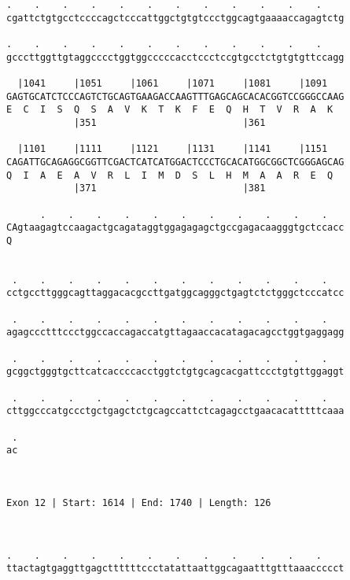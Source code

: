 \documentclass{article}
\begin{document}
\begin{Verbatim}
.    .    .    .    .    .    .    .    .    .    .    .    
cgattctgtgcctccccagctcccattggctgtgtccctggcagtgaaaaccagagtctg
                                                            
.    .    .    .    .    .    .    .    .    .    .    .    
gcccttggttgtaggcccctggtggcccccacctccctccgtgcctctgtgtgttccagg
                                                            
  |1041     |1051     |1061     |1071     |1081     |1091   
GAGTGCATCTCCCAGTCTGCAGTGAAGACCAAGTTTGAGCAGCACACGGTCCGGGCCAAG
E  C  I  S  Q  S  A  V  K  T  K  F  E  Q  H  T  V  R  A  K  
            |351                          |361              
  
  |1101     |1111     |1121     |1131     |1141     |1151   
CAGATTGCAGAGGCGGTTCGACTCATCATGGACTCCCTGCACATGGCGGCTCGGGAGCAG
Q  I  A  E  A  V  R  L  I  M  D  S  L  H  M  A  A  R  E  Q  
            |371                          |381              
  
      .    .    .    .    .    .    .    .    .    .    .   
CAgtaagagtccaagactgcagataggtggagagagctgccgagacaagggtgctccacc
Q                                                           
                                                            
  
 .    .    .    .    .    .    .    .    .    .    .    .   
cctgccttgggcagttaggacacgccttgatggcagggctgagtctctgggctcccatcc
                                                            
 .    .    .    .    .    .    .    .    .    .    .    .   
agagccctttccctggccaccagaccatgttagaaccacatagacagcctggtgaggagg
                                                            
 .    .    .    .    .    .    .    .    .    .    .    .   
gcggctgggtgcttcatcaccccacctggtctgtgcagcacgattccctgtgttggaggt
                                                            
 .    .    .    .    .    .    .    .    .    .    .    .   
cttggcccatgccctgctgagctctgcagccattctcagagcctgaacacatttttcaaa
                                                            
 .
ac
  
  
 
Exon 12 | Start: 1614 | End: 1740 | Length: 126



.    .    .    .    .    .    .    .    .    .    .    .    
ttactagtgaggttgagcttttttccctatattaattggcagaatttgtttaaaccccct
                                                            

\end{Verbatim}
\end{document}
